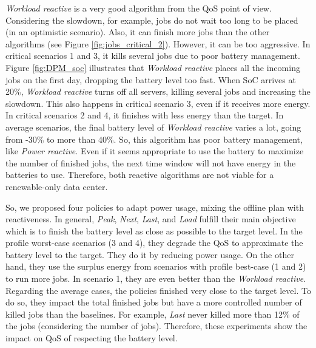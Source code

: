 \emph{Workload reactive} is a very good algorithm from the QoS point of view. Considering the slowdown, for example, jobs do not wait too long to be placed (in an optimistic scenario). Also, it can finish more jobs than the other algorithms (see Figure \ref{fig:jobs_critical_2}). However, it can be too aggressive. In critical scenarios 1 and 3, it kills several jobs due to poor battery management. Figure \ref{fig:DPM_soc} illustrates that \emph{Workload reactive} places all the incoming jobs on the first day, dropping the battery level too fast. When SoC arrives at 20\%, \emph{Workload reactive} turns off all servers, killing several jobs and increasing the slowdown. This also happens in critical scenario 3, even if it receives more energy. In critical scenarios 2 and 4, it finishes with less energy than the target. In average scenarios, the final battery level of \emph{Workload reactive} varies a lot, going from -30\% to more than 40\%. So, this algorithm has poor battery management, like \emph{Power reactive}. Even if it seems appropriate to use the battery to maximize the number of finished jobs, the next time window will not have energy in the batteries to use. Therefore, both reactive algorithms are not viable for a renewable-only data center.

So, we proposed four policies to adapt power usage, mixing the offline plan with reactiveness. In general, \emph{Peak}, \emph{Next}, \emph{Last}, and \emph{Load} fulfill their main objective which is to finish the battery level as close as possible to the target level. In the profile worst-case scenarios (3 and 4), they degrade the QoS to approximate the battery level to the target. They do it by reducing power usage. On the other hand, they use the surplus energy from scenarios with profile best-case (1 and 2) to run more jobs. In scenario 1, they are even better than the \emph{Workload reactive}. Regarding the average cases, the policies finished very close to the target level. To do so, they impact the total finished jobs but have a more controlled number of killed jobs than the baselines. For example, \emph{Last} never killed more than 12\% of the jobs (considering the number of jobs). Therefore, these experiments show the impact on QoS of respecting the battery level.

